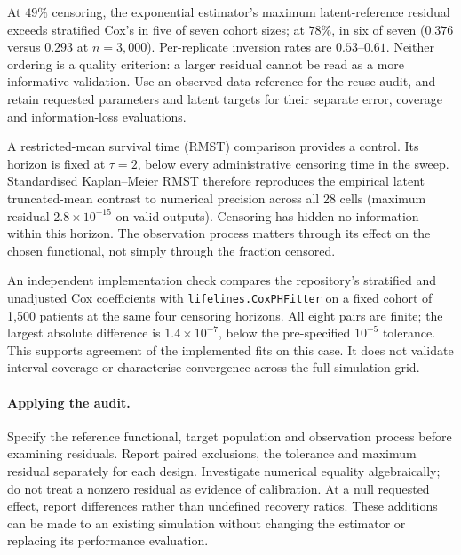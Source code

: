 At $49\%$ censoring, the exponential estimator's maximum latent-reference
residual exceeds stratified Cox's in five of seven cohort sizes; at $78\%$, in
six of seven ($0.376$ versus $0.293$ at $n=3{,}000$). Per-replicate inversion
rates are $0.53$--$0.61$. Neither ordering is a quality criterion: a larger
residual cannot be read as a more informative validation. Use an observed-data
reference for the reuse audit, and retain requested parameters and latent
targets for their separate error, coverage and information-loss evaluations.

A restricted-mean survival time (RMST) comparison provides a control.
Its horizon is fixed at $\tau=2$, below every administrative censoring time
in the sweep. Standardised Kaplan--Meier RMST therefore reproduces the empirical
latent truncated-mean contrast to numerical precision across all 28 cells
(maximum residual $2.8\times10^{-15}$ on valid outputs). Censoring has hidden
no information within this horizon. The observation process matters through
its effect on the chosen functional, not simply through the fraction censored.

An independent implementation check compares the repository's stratified
and unadjusted Cox coefficients with \texttt{lifelines.CoxPHFitter} on a
fixed cohort of 1{,}500 patients at the same four censoring horizons. All eight
pairs are finite; the largest absolute difference is $1.4\times10^{-7}$,
below the pre-specified $10^{-5}$ tolerance. This supports agreement of the
implemented fits on this case. It does not validate interval coverage or
characterise convergence across the full simulation grid.

\paragraph{Applying the audit.}
Specify the reference functional, target population and observation process
before examining residuals. Report paired exclusions, the tolerance and maximum
residual separately for each design. Investigate numerical equality
algebraically; do not treat a nonzero residual as evidence of calibration.
At a null requested effect, report differences rather than undefined recovery
ratios. These additions can be made to an existing simulation without changing
the estimator or replacing its performance evaluation.
